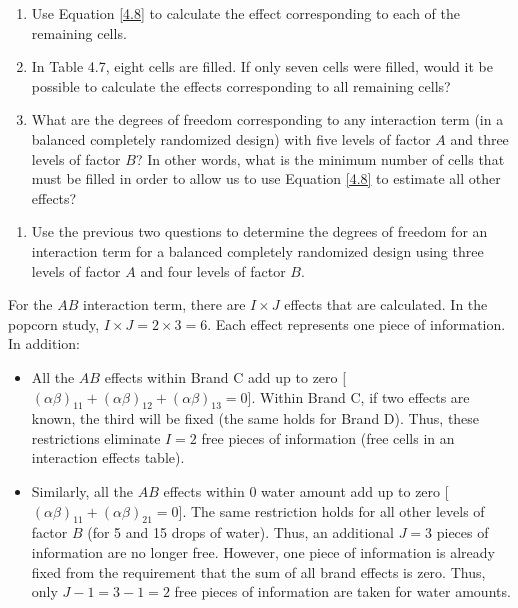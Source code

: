 \documentclass[
]{book}
\providecommand{\tightlist}{%
  \setlength{\itemsep}{0pt}\setlength{\parskip}{0pt}}
\begin{document}
\begin{enumerate}
\def\labelenumi{\alph{enumi}.}
\item
  Use Equation \ref{4.8} to calculate the effect corresponding to each of the remaining cells.
\item
  In Table 4.7, eight cells are filled. If only seven cells were filled, would it be possible to calculate the effects corresponding to all remaining cells?
\item
  What are the degrees of freedom corresponding to any interaction term (in a balanced completely randomized design) with five levels of factor \(A\) and three levels of factor \(B\)? In other words, what is the minimum number of cells that must be filled in order to allow us to use Equation \ref{4.8} to estimate all other effects?
\end{enumerate}

\begin{enumerate}
\def\labelenumi{\arabic{enumi}.}
\setcounter{enumi}{32}
\tightlist
\item
  Use the previous two questions to determine the degrees of freedom for an interaction term for a balanced completely randomized design using three levels of factor \(A\) and four levels of factor \(B\).
\end{enumerate}

For the \(AB\) interaction term, there are \(I \times J\) effects that are calculated. In the popcorn study, \(I \times J = 2 \times 3 = 6\). Each effect represents one piece of information. In addition:

\begin{itemize}
\tightlist
\item
  All the \(AB\) effects within Brand C add up to zero {[}\((\alpha\beta)_{11} + (\alpha\beta)_{12} + (\alpha\beta)_{13} = 0\){]}. Within Brand C, if two effects are known, the third will be fixed (the same holds for Brand D). Thus, these restrictions eliminate \(I = 2\) free pieces of information (free cells in an interaction effects table).
\item
  Similarly, all the \(AB\) effects within 0 water amount add up to zero {[}\((\alpha\beta)_{11} + (\alpha\beta)_{21} = 0\){]}. The same restriction holds for all other levels of factor \(B\) (for 5 and 15 drops of water). Thus, an additional \(J = 3\) pieces of information are no longer free. However, one piece of information is already fixed from the requirement that the sum of all brand effects is zero. Thus, only \(J-1 = 3-1=2\) free pieces of information are taken for water amounts.
\end{itemize}
\end{document}
